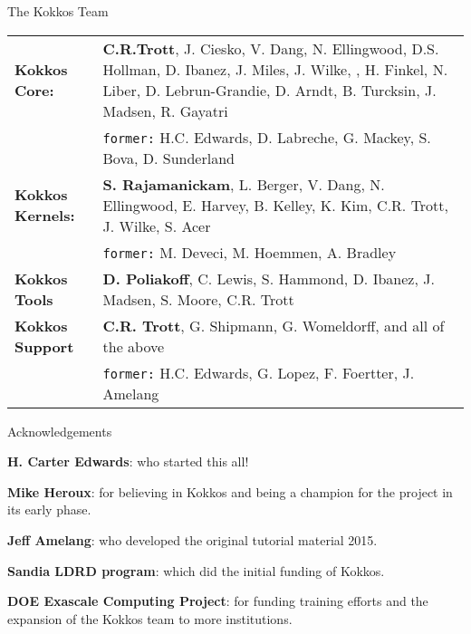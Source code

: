\begin{frame}[fragile]{The Kokkos Team}
\vspace{-5pt}
    
\vspace{-5pt}
	\begin{scriptsize}
	\begin{tabular}{p{} p{} }
		\textbf{Kokkos Core:} & \textbf{C.R.Trott}, J. Ciesko, V. Dang, N. Ellingwood, D.S. Hollman, D. Ibanez, J. Miles, J. Wilke, 
		, H. Finkel, N. Liber, D. Lebrun-Grandie, D. Arndt, B. Turcksin, J. Madsen, R. Gayatri \\
		& \texttt{former:} H.C. Edwards, D. Labreche, G. Mackey, S. Bova, D. Sunderland \\
		\textbf{Kokkos Kernels:} & \textbf{S. Rajamanickam}, L. Berger, V. Dang, N. Ellingwood, E. Harvey, B. Kelley, K. Kim, C.R. Trott, J. Wilke, S. Acer \\
		& \texttt{former:} M. Deveci, M. Hoemmen, A. Bradley \\
		\textbf{Kokkos Tools} & \textbf{D. Poliakoff}, C. Lewis, S. Hammond, D. Ibanez, J. Madsen, S. Moore, C.R. Trott \\
		\textbf{Kokkos Support} & \textbf{C.R. Trott}, G. Shipmann, G. Womeldorff, and all of the above \\
		& \texttt{former:} H.C. Edwards, G. Lopez, F. Foertter, J. Amelang
	\end{tabular}
	\end{scriptsize}
\end{frame}

\begin{frame}[fragile]{Acknowledgements}

\textbf{H. Carter Edwards}: who started this all!

\vspace{10pt}
\textbf{Mike Heroux}: for believing in Kokkos and being a champion for the project in its early phase.

\vspace{10pt}
\textbf{Jeff Amelang}: who developed the original tutorial material 2015.

\vspace{10pt}
\textbf{Sandia LDRD program}: which did the initial funding of Kokkos.

\vspace{10pt}
\textbf{DOE Exascale Computing Project}: for funding training efforts and the expansion of the Kokkos team to more institutions.
\end{frame}

